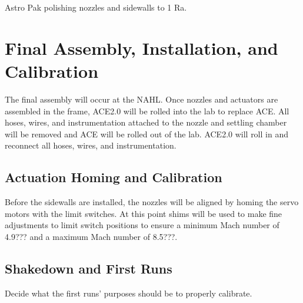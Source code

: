 Astro Pak polishing nozzles and sidewalls to 1 Ra.

\section{Final Assembly, Installation, and Calibration}

The final assembly will occur at the NAHL. Once nozzles and actuators are assembled in the frame, ACE2.0 will be rolled into the lab to replace ACE. All hoses, wires, and instrumentation attached to the nozzle and settling chamber will be removed and ACE will be rolled out of the lab. ACE2.0 will roll in and reconnect all hoses, wires, and instrumentation.

\subsection{Actuation Homing and Calibration}

Before the sidewalls are installed, the nozzles will be aligned by homing the servo motors with the limit switches. At this point shims will be used to make fine adjustments to limit switch positions to ensure a minimum Mach number of 4.9??? and a maximum Mach number of 8.5???.

\subsection{Shakedown and First Runs}

Decide what the first runs' purposes should be to properly calibrate.

